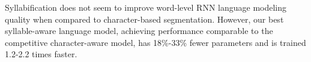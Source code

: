 Syllabification does not seem to improve word-level RNN language modeling quality when compared to character-based segmentation. However, our best syllable-aware language model, achieving performance comparable to the competitive character-aware model, has 18\%-33\% fewer parameters and is trained 1.2-2.2 times faster.

